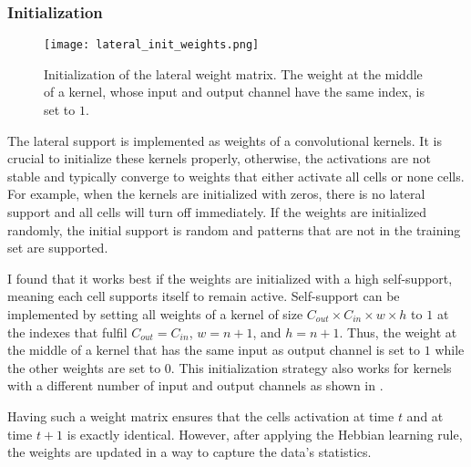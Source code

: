 \subsubsection{Initialization}
\begin{figure}[h]
    \centering
    \texttt{[image: lateral\_init\_weights.png]}
    \caption[Initialization of the lateral weight matrix]{Initialization of the lateral weight matrix. The weight at the middle of a kernel, whose input and output channel have the same index, is set to $1$.}
\end{figure}
The lateral support is implemented as weights of a convolutional kernels.
It is crucial to initialize these kernels properly, otherwise, the activations are not stable and typically converge to weights that either activate all cells or none cells.
For example, when the kernels are initialized with zeros, there is no lateral support and all cells will turn off immediately.
If the weights are initialized randomly, the initial support is random and patterns that are not in the training set  are supported.

I found that it works best if the weights are initialized with a high self-support, meaning each cell supports itself to remain active.
Self-support can be implemented by setting all weights of a kernel of size $C_{out} \times C_{in} \times w \times h$ to $1$ at the indexes that fulfil 
$C_{out} = C_{in}$, $w = n+1$, and $h = n+1$. Thus, the weight at the middle of a kernel that has the same input as output channel is set to $1$ while the other weights are set to $0$. This initialization strategy also works for kernels with a different number of input and output channels as shown in .

Having such a weight matrix ensures that the cells activation at time $t$ and at time $t+1$ is exactly identical. However, after applying the Hebbian learning rule, the weights are updated in a way to capture the data's statistics.


